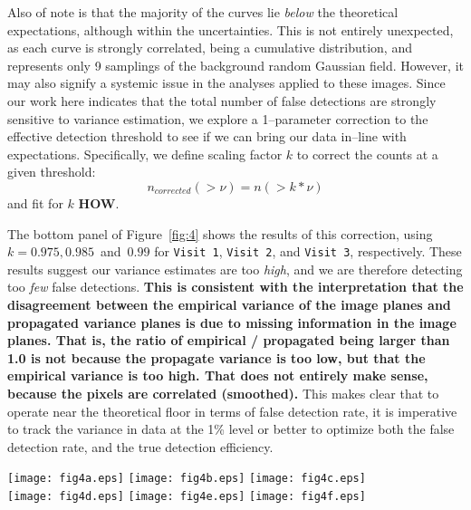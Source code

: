 \documentclass[iop]{emulateapj}
\begin{document}
Also of note is that the majority of the curves lie {\it below} the theoretical expectations, although within the uncertainties.
This is not entirely unexpected, as each curve is strongly correlated, being a cumulative distribution, and represents only 9 samplings of the background random Gaussian field.
However, it may also signify a systemic issue in the analyses applied to these images.
Since our work here indicates that the total number of false detections are strongly sensitive to variance estimation, we explore a 1--parameter correction to the effective detection threshold to see if we can bring our data in--line with expectations.
Specifically, we define scaling factor $k$ to correct the counts at a given threshold:
\begin{equation}
n_{corrected}(>\nu) = n(> k * \nu)
\label{correction}
\end{equation}
and fit for $k$ {\bf HOW}.

The bottom panel of Figure~\ref{fig:4} shows the results of this correction, using $k = 0.975, 0.985 $~and~$ 0.99$ for {\tt Visit 1}, {\tt Visit 2}, and {\tt Visit 3}, respectively.
These results suggest our variance estimates are too {\it high}, and we are therefore detecting too {\it few} false detections.
{\bf This is consistent with the interpretation that the disagreement between the empirical variance of the image planes and propagated variance planes is due to missing information in the image planes.
That is, the ratio of empirical / propagated being larger than 1.0 is not because the propagate variance is too low, but that the empirical variance is too high.
That does not entirely make sense, because the pixels are correlated (smoothed).}
This makes clear that to operate near the theoretical floor in terms of false detection rate, it is imperative to track the variance in data at the 1\% level or better to optimize both the false detection rate, and the true detection efficiency.
\begin{figure*}[!ht]
  \centering
  \texttt{[image: fig4a.eps]}
  \texttt{[image: fig4b.eps]}
  \texttt{[image: fig4c.eps]} \\
  \texttt{[image: fig4d.eps]}
  \texttt{[image: fig4e.eps]}
  \texttt{[image: fig4f.eps]} \\
  \caption{Here we show the comparison of detected false positive count to the analytic prediction.
    In all cases the blue circles are the pre--filter case and the red squares are the post--filter case.
    In the bottom row we undertake a 1--parameter correction to align the predicted and measured values.
    The 2.5\%, 1.5\% and 1\% scaling in $k$ correspond to a 5\%, 3\%, 2\% over-estimation of the image variance, respectively from left to right in the bottom pane. 
    The shaded area is the 1-$\sigma$ confidence envelope determined from Monte Carlo simulations (Section~\ref{sec-analyticfp}).}
\label{fig:4}
\end{figure*}
\end{document}
